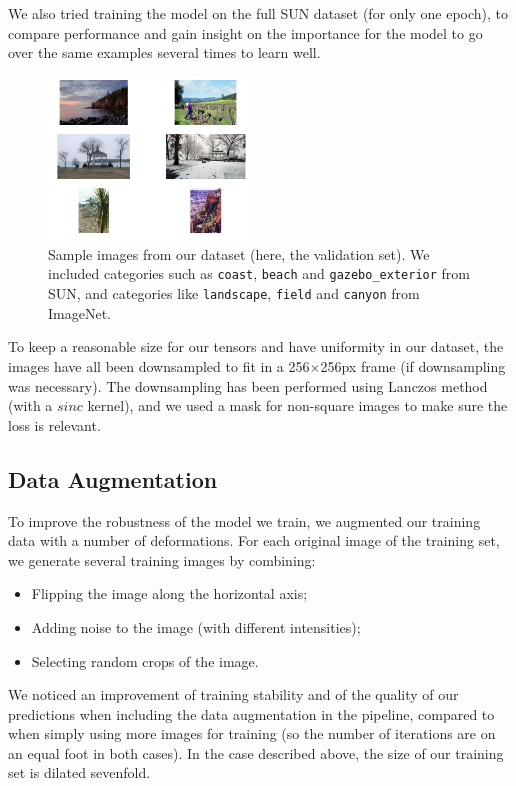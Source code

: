 \documentclass[10pt,twocolumn,letterpaper]{article}
\begin{document}
We also tried training the model on the full SUN dataset (for only one epoch), to compare performance and gain insight on the importance for the model to go over the same examples several times to learn well.

\begin{figure}
\begin{center}
\includegraphics[width=200px]{sampletrain.png}
\caption{Sample images from our dataset (here, the validation set). We included categories such as \texttt{coast}, \texttt{beach} and \texttt{gazebo\_exterior} from SUN, and categories like \texttt{landscape}, \texttt{field} and \texttt{canyon} from ImageNet.}
\label{sampletrain}
\end{center}
\end{figure}

To keep a reasonable size for our tensors and have uniformity in our dataset, the images have all been downsampled to fit in a 256$\times$256px frame (if downsampling was necessary). The downsampling has been performed using Lanczos method (with a $sinc$ kernel), and we used a mask for non-square images to make sure the loss is relevant.

\subsection{Data Augmentation}

To improve the robustness of the model we train, we augmented our training data with a number of deformations. For each original image of the training set, we generate several training images by combining:
\begin{itemize}
\item Flipping the image along the horizontal axis;
\item Adding noise to the image (with different intensities);
\item Selecting random crops of the image.
\end{itemize}

We noticed an improvement of training stability and of the quality of our predictions when including the data augmentation in the pipeline, compared to when simply using more images for training (so the number of iterations are on an equal foot in both cases). In the case described above, the size of our training set is dilated sevenfold.
\end{document}
